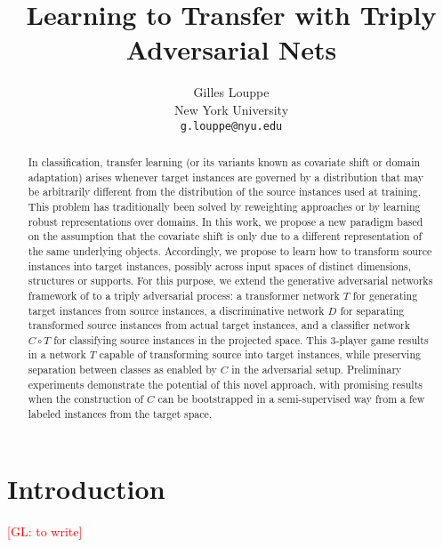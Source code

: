 \documentclass{article}
\title{Learning to Transfer with Triply Adversarial Nets}
\author{
Gilles Louppe \\
New York University\\
\texttt{g.louppe@nyu.edu} \\
}
\newcommand{\glnote}[1]{\textcolor{red}{[GL: #1]}}
\begin{document}
\maketitle

\begin{abstract}

In classification, transfer learning (or its variants known as covariate shift
or domain adaptation) arises whenever target instances are governed by a
distribution that may be arbitrarily different from the distribution of the
source instances used at training. This problem has traditionally been solved by reweighting
approaches or by learning robust representations over domains. In this work, we
propose a new paradigm based on the assumption that the covariate shift is only
due to a different representation of the same underlying objects.
Accordingly, we propose to learn how to transform source instances into target
instances, possibly across input spaces of distinct dimensions, structures or
supports. For this purpose, we extend the generative adversarial networks
framework of \cite{goodfellow2014generative} to a triply adversarial process: a
transformer network $T$ for generating target instances from source instances, a
discriminative network $D$ for separating transformed source instances from
actual target instances, and a classifier network $C \circ T$ for classifying source
instances in the projected space. This 3-player game results in a network $T$
capable of transforming source into target instances, while preserving
separation between classes as enabled by $C$ in the adversarial setup.
Preliminary experiments demonstrate the potential of this novel approach, with promising
results when the construction of $C$ can be bootstrapped in a semi-supervised
way  from a few labeled instances from the target space.

\end{abstract}

\section{Introduction}

\glnote{to write}

\end{document}
